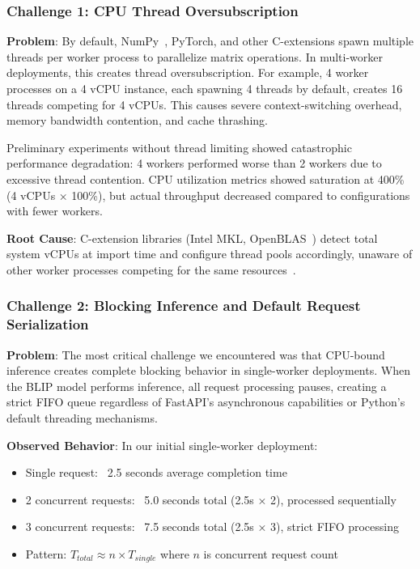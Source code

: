 \subsubsection{Challenge 1: CPU Thread Oversubscription}

\textbf{Problem}: By default, NumPy~\cite{numpy2024}, PyTorch, and other C-extensions spawn multiple threads per worker process to parallelize matrix operations. In multi-worker deployments, this creates thread oversubscription. For example, 4 worker processes on a 4 vCPU instance, each spawning 4 threads by default, creates 16 threads competing for 4 vCPUs. This causes severe context-switching overhead, memory bandwidth contention, and cache thrashing.

Preliminary experiments without thread limiting showed catastrophic performance degradation: 4 workers performed worse than 2 workers due to excessive thread contention. CPU utilization metrics showed saturation at 400\% (4 vCPUs × 100\%), but actual throughput decreased compared to configurations with fewer workers.

\textbf{Root Cause}: C-extension libraries (Intel MKL, OpenBLAS~\cite{openblas2024}) detect total system vCPUs at import time and configure thread pools accordingly, unaware of other worker processes competing for the same resources~\cite{intel2023mkl}.

\subsubsection{Challenge 2: Blocking Inference and Default Request Serialization}

\textbf{Problem}: The most critical challenge we encountered was that CPU-bound inference creates complete blocking behavior in single-worker deployments. When the BLIP model performs inference, all request processing pauses, creating a strict FIFO queue regardless of FastAPI's asynchronous capabilities or Python's default threading mechanisms.

\textbf{Observed Behavior}: In our initial single-worker deployment:
\begin{itemize}
\item Single request: ~2.5 seconds average completion time
\item 2 concurrent requests: ~5.0 seconds total (2.5s × 2), processed sequentially
\item 3 concurrent requests: ~7.5 seconds total (2.5s × 3), strict FIFO processing
\item Pattern: $T_{total} \approx n \times T_{single}$ where $n$ is concurrent request count
\end{itemize}

